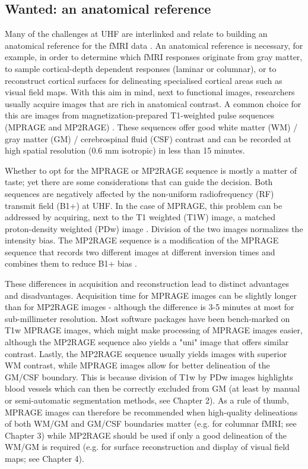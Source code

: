 \subsection{Wanted: an anatomical reference}
Many of the challenges at UHF are interlinked and relate to building an anatomical reference for the fMRI data \parencite{Polimeni2017}. An anatomical reference is necessary, for example, in order to determine which fMRI responses originate from gray matter, to sample cortical-depth dependent responses (laminar or columnar), or to reconstruct cortical surfaces for delineating specialised cortical areas such as visual field maps. With this aim in mind, next to functional images, researchers usually acquire images that are rich in anatomical contrast. A common choice for this are images from magnetization-prepared T1-weighted pulse sequences (MPRAGE and MP2RAGE) \parencite{Mugler1990, Moortele2009, Marques2010}. These sequences offer good white matter (WM) / gray matter (GM) / cerebrospinal fluid (CSF) contrast and can be recorded at high spatial resolution (0.6 mm isotropic) in less than 15 minutes.

Whether to opt for the MPRAGE or MP2RAGE sequence is mostly a matter of taste; yet there are some considerations that can guide the decision. Both sequences are negatively affected by the non-uniform radiofrequency (RF) transmit field (B1+) at UHF. In the case of MPRAGE, this problem can be addressed by acquiring, next to the T1 weighted (T1W) image, a matched proton-density weighted (PDw) image \parencite{Moortele2009}. Division of the two images normalizes the intensity bias. The MP2RAGE sequence is a modification of the MPRAGE sequence that records two different images at different inversion times and combines them to reduce B1+ bias \parencite{Marques2010}.

These differences in acquisition and reconstruction lead to distinct advantages and disadvantages. Acquisition time for MPRAGE images can be slightly longer than for MP2RAGE images - although the difference is 3-5 minutes at most for sub-millimeter resolution. Most software packages have been bench-marked on T1w MPRAGE images, which might make processing of MPRAGE images easier, although the MP2RAGE sequence also yields a "uni" image that offers similar contrast. Lastly, the MP2RAGE sequence usually yields images with superior WM contrast, while MPRAGE images allow for better delineation of the GM/CSF boundary. This is because division of T1w by PDw images highlights blood vessels \parencite{Moortele2009} which can then be correctly excluded from GM (at least by manual or semi-automatic segmentation methods, see Chapter 2). As a rule of thumb, MPRAGE images can therefore be recommended when high-quality delineations of both WM/GM and GM/CSF boundaries matter (e.g. for columnar fMRI; see Chapter 3) while MP2RAGE should be used if only a good delineation of the WM/GM is required (e.g. for surface reconstruction and display of visual field maps; see Chapter 4).

